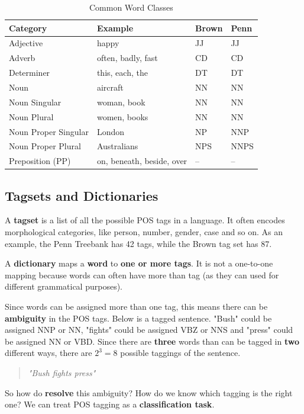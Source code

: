 \documentclass{article}
\begin{document}
\begin{table}
	\centering
	\begin{tabular}{|l|l|l|l|}
		\hline
		\textbf{Category} & \textbf{Example} & \textbf{Brown} & \textbf{Penn} \\
		\hline
		Adjective & happy & JJ & JJ \\
		Adverb & often, badly, fast & CD & CD \\
		Determiner & this, each, the & DT & DT \\
		Noun & aircraft & NN & NN \\
		Noun Singular & woman, book & NN & NN \\
		Noun Plural & women, books & NN & NN \\
		Noun Proper Singular & London & NP & NNP \\
		Noun Proper Plural & Australians & NPS & NNPS \\
		Preposition (PP) & on, beneath, beside, over & -- & -- \\
		\hline 
	\end{tabular}
	\caption{Common Word Classes}
	\label{tab:common-word-classes} 
\end{table}

\subsection{Tagsets and Dictionaries}

A \textbf{tagset} is a list of all the possible POS tags in a language. It often encodes morphological categories, like person, number, gender,  case and so on. As an example, the Penn Treebank has 42 tags, while the Brown tag set has 87.

A \textbf{dictionary} maps a \textbf{word} to \textbf{one or more tags}. It is not a one-to-one mapping because words can often have more than tag (as they can used for different grammatical purposes).

Since words can be assigned more than one tag, this means there can be \textbf{ambiguity} in the POS tags. Below is a tagged sentence. "Bush" could be assigned NNP or NN, "fights" could be assigned VBZ or NNS and "press" could be assigned NN or VBD. Since there are \textbf{three} words than can be tagged in \textbf{two} different ways, there are $2^3 = 8$ possible taggings of the sentence.
\begin{quote}
\textit{"Bush fights press"}
\end{quote}
So how do \textbf{resolve} this ambiguity? How do we know which tagging is the right one? We can treat POS tagging as a \textbf{classification task}.
\end{document}
